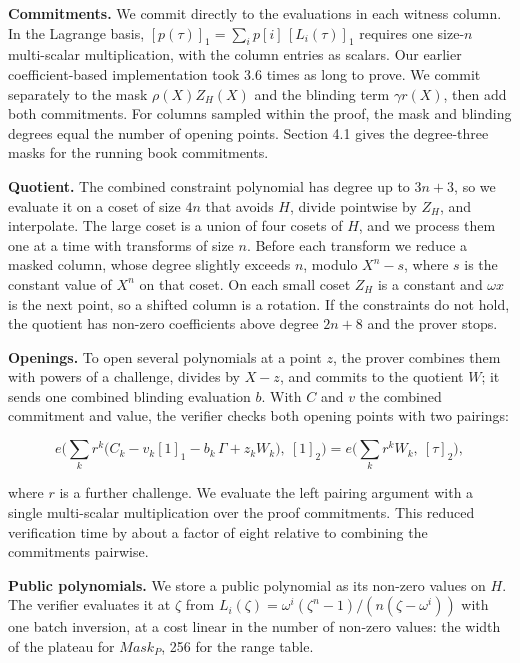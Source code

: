 \textbf{Commitments.} We commit directly to the evaluations in each witness column. In the Lagrange basis, \([p(\tau)]_1=\sum_i p[i]\,[L_i(\tau)]_1\) requires one size-\(n\) multi-scalar multiplication, with the column entries as scalars. Our earlier coefficient-based implementation took 3.6 times as long to prove. We commit separately to the mask \(\rho(X)Z_H(X)\) and the blinding term \(\gamma r(X)\), then add both commitments. For columns sampled within the proof, the mask and blinding degrees equal the number of opening points. Section 4.1 gives the degree-three masks for the running book commitments.

\textbf{Quotient.} The combined constraint polynomial has degree up to \(3n + 3\), so we evaluate it on a coset of size \(4n\) that avoids \(H\), divide pointwise by \(Z_H\), and interpolate. The large coset is a union of four cosets of \(H\), and we process them one at a time with transforms of size \(n\). Before each transform we reduce a masked column, whose degree slightly exceeds \(n\), modulo \(X^n - s\), where \(s\) is the constant value of \(X^n\) on that coset. On each small coset \(Z_H\) is a constant and \(\omega x\) is the next point, so a shifted column is a rotation. If the constraints do not hold, the quotient has non-zero coefficients above degree \(2n + 8\) and the prover stops.

\textbf{Openings.} To open several polynomials at a point \(z\), the prover combines them with powers of a challenge, divides by \(X - z\), and commits to the quotient \(W\); it sends one combined blinding evaluation \(b\). With \(C\) and \(v\) the combined commitment and value, the verifier checks both opening points with two pairings:

\[
e\Big(\sum_{k} r^k \big(C_k - v_k [1]_1 - b_k\, \Gamma + z_k W_k\big),\ [1]_2\Big) = e\Big(\sum_{k} r^k W_k,\ [\tau]_2\Big),
\]

where \(r\) is a further challenge. We evaluate the left pairing argument with a single multi-scalar multiplication over the proof commitments. This reduced verification time by about a factor of eight relative to combining the commitments pairwise.

\textbf{Public polynomials.} We store a public polynomial as its non-zero values on \(H\). The verifier evaluates it at \(\zeta\) from \(L_i(\zeta) = \omega^i(\zeta^n - 1)/(n(\zeta - \omega^i))\) with one batch inversion, at a cost linear in the number of non-zero values: the width of the plateau for \(Mask_P\), 256 for the range table.

